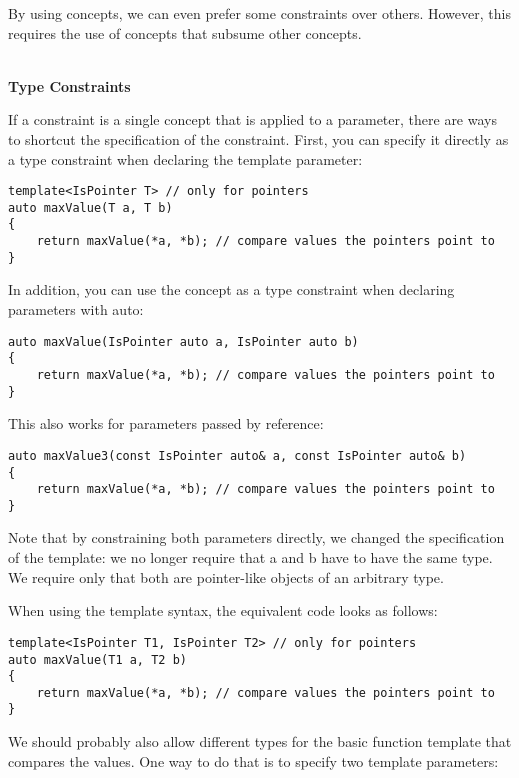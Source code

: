 By using concepts, we can even prefer some constraints over others. However, this requires the use of concepts that subsume other concepts.

\noindent
\hspace*{\fill} \\ %
\textbf{Type Constraints}

If a constraint is a single concept that is applied to a parameter, there are ways to shortcut the specification of the constraint. First, you can specify it directly as a type constraint when declaring the template parameter:

\begin{lstlisting}[style=styleCXX]
template<IsPointer T> // only for pointers
auto maxValue(T a, T b)
{
	return maxValue(*a, *b); // compare values the pointers point to
}
\end{lstlisting}

In addition, you can use the concept as a type constraint when declaring parameters with auto:

\begin{lstlisting}[style=styleCXX]
auto maxValue(IsPointer auto a, IsPointer auto b)
{
	return maxValue(*a, *b); // compare values the pointers point to
}
\end{lstlisting}

This also works for parameters passed by reference:

\begin{lstlisting}[style=styleCXX]
auto maxValue3(const IsPointer auto& a, const IsPointer auto& b)
{
	return maxValue(*a, *b); // compare values the pointers point to
}
\end{lstlisting}

Note that by constraining both parameters directly, we changed the specification of the template: we no longer require that a and b have to have the same type. We require only that both are pointer-like objects of an arbitrary type.

When using the template syntax, the equivalent code looks as follows:

\begin{lstlisting}[style=styleCXX]
template<IsPointer T1, IsPointer T2> // only for pointers
auto maxValue(T1 a, T2 b)
{
	return maxValue(*a, *b); // compare values the pointers point to
}
\end{lstlisting}

We should probably also allow different types for the basic function template that compares the values. One way to do that is to specify two template parameters:

